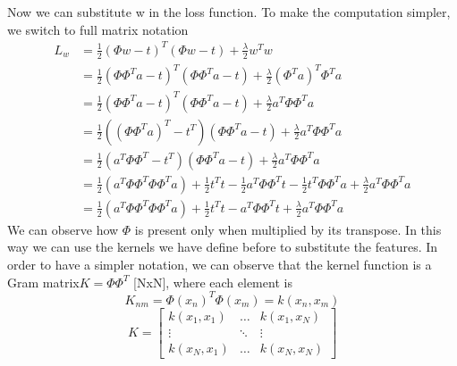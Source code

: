 \documentclass[main.tex]{subfiles}
\begin{document}
Now we can substitute w in the loss function. To make the computation simpler, we switch to full matrix notation
\begin{align*}
    L_w & = \frac{1}{2}(\Phi w - t)^T(\Phi w - t)+\frac{\lambda}{2}w^T w                                                                                                     \\
        & = \frac{1}{2}(\Phi \Phi^T a - t)^T(\Phi \Phi^T a - t)+\frac{\lambda}{2}(\Phi^T a)^T \Phi^T a                                                                       \\
        & = \frac{1}{2}(\Phi \Phi^T a - t)^T(\Phi \Phi^T a - t)+\frac{\lambda}{2} a^T \Phi \Phi^T a                                                                          \\
        & = \frac{1}{2}((\Phi \Phi^T a)^T - t^T)(\Phi \Phi^T a - t)+\frac{\lambda}{2} a^T \Phi \Phi^T a                                                                      \\
        & = \frac{1}{2}(a^T \Phi \Phi^T - t^T)(\Phi \Phi^T a - t)+\frac{\lambda}{2} a^T \Phi \Phi^T a                                                                        \\
        & = \frac{1}{2}(a^T \Phi \Phi^T \Phi \Phi^T a) + \frac{1}{2}t^T t -\frac{1}{2} a^T \Phi \Phi^T t -\frac{1}{2} t^T \Phi \Phi^T a +\frac{\lambda}{2} a^T \Phi \Phi^T a \\
        & = \frac{1}{2}(a^T \Phi \Phi^T \Phi \Phi^T a) + \frac{1}{2}t^T t - a^T \Phi \Phi^T t +\frac{\lambda}{2} a^T \Phi \Phi^T a
\end{align*}
We can observe how $\Phi$ is present only when multiplied by its transpose. In this way we can use the kernels we have define before to substitute the features. In order to have a simpler notation, we can observe that the kernel function is a Gram matrix\footnotemark $K=\Phi\Phi^T$ [NxN], where each element is
\begin{equation*}
    K_{nm} = \Phi(x_n)^T \Phi(x_m) = k(x_n,x_m)
\end{equation*}
\begin{equation}
    K =
    \begin{bmatrix}
        k(x_1,x_1) & \dots  & k(x_1,x_N) \\
        \vdots     & \ddots & \vdots     \\
        k(x_N,x_1) & \dots  & k(x_N,x_N)
    \end{bmatrix}
\end{equation}
\end{document}
